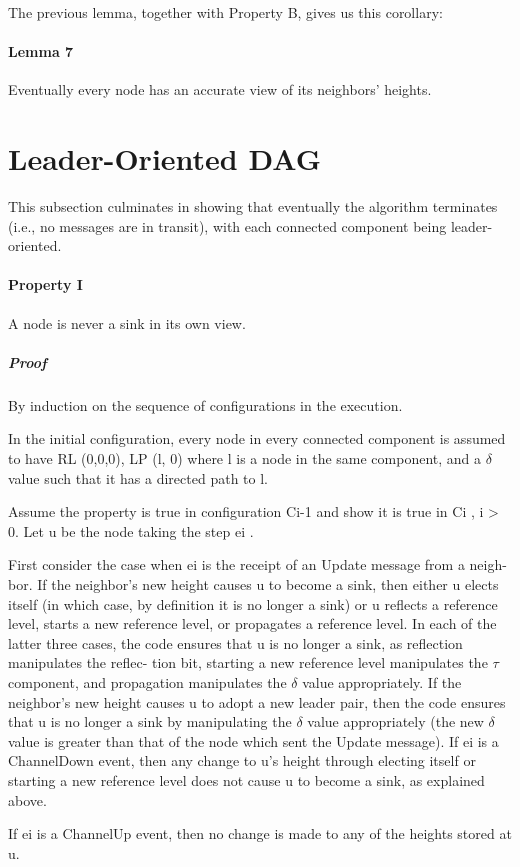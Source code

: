 The previous lemma, together with Property B, gives us this corollary:

\paragraph{Lemma 7}Eventually every node has an accurate view of its neighbors’ heights.
\section{Leader-Oriented DAG}
This subsection culminates in showing that eventually the algorithm terminates (i.e., no messages are in transit), with each connected component being leader-oriented.

\paragraph{Property I} A node is never a sink in its own view.
\subparagraph{Proof}By induction on the sequence of configurations in the execution.

In the initial configuration, every node in every connected component is assumed to have RL (0,0,0), LP (l, 0) where l is a node in the same component, and a $\delta$ value such that it has a directed path to l.

Assume the property is true in configuration Ci-1 and show it is true in Ci , i > 0. Let u be the node taking the step ei .

First consider the case when ei is the receipt of an Update message from a neigh- bor. If the neighbor’s new height causes u to become a sink, then either u elects itself (in which case, by definition it is no longer a sink) or u reflects a reference level, starts a new reference level, or propagates a reference level. In each of the latter three cases, the code ensures that u is no longer a sink, as reflection manipulates the reflec- tion bit, starting a new reference level manipulates the $\tau$ component, and propagation manipulates the $\delta$ value appropriately. If the neighbor’s new height causes u to adopt a new leader pair, then the code ensures that u is no longer a sink by manipulating the $\delta$ value appropriately (the new $\delta$ value is greater than that of the node which sent the Update message). If ei is a ChannelDown event, then any change to u’s height through electing itself or starting a new reference level does not cause u to become a sink, as explained above.

If ei is a ChannelUp event, then no change is made to any of the heights stored at u.

